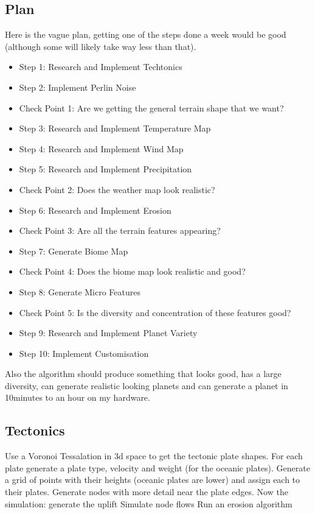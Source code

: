 \documentclass[11pt]{article}
\begin{document}
    \subsection{Plan}\label{subsec:plan}
    Here is the vague plan, getting one of the steps done a week would be good (although some will likely take way less than that).
    \begin{itemize}
        \item Step 1: Research and Implement Techtonics
        \item Step 2: Implement Perlin Noise
        \item Check Point 1: Are we getting the general terrain shape that we want?
        \item Step 3: Research and Implement Temperature Map
        \item Step 4: Research and Implement Wind Map
        \item Step 5: Research and Implement Precipitation
        \item Check Point 2: Does the weather map look realistic?
        \item Step 6: Research and Implement Erosion
        \item Check Point 3: Are all the terrain features appearing?
        \item Step 7: Generate Biome Map
        \item Check Point 4: Does the biome map look realistic and good?
        \item Step 8: Generate Micro Features
        \item Check Point 5: Is the diversity and concentration of these features good?
        \item Step 9: Research and Implement Planet Variety
        \item Step 10: Implement Customisation
    \end{itemize}
    Also the algorithm should produce something that looks good, has a large diversity, can generate realistic looking planets and can generate a planet in 10minutes to an hour on my hardware.
    \subsection{Tectonics}\label{subsec:tectonics}
    Use a Voronoi Tessalation in 3d space to get the tectonic plate shapes.
    For each plate generate a plate type, velocity and weight (for the oceanic plates).
    Generate a grid of points with their heights (oceanic plates are lower) and assign each to their plates.
    Generate nodes with more detail near the plate edges.
    Now the simulation:
    generate the uplift
    Simulate node flows
    Run an erosion algorithm
\end{document}
